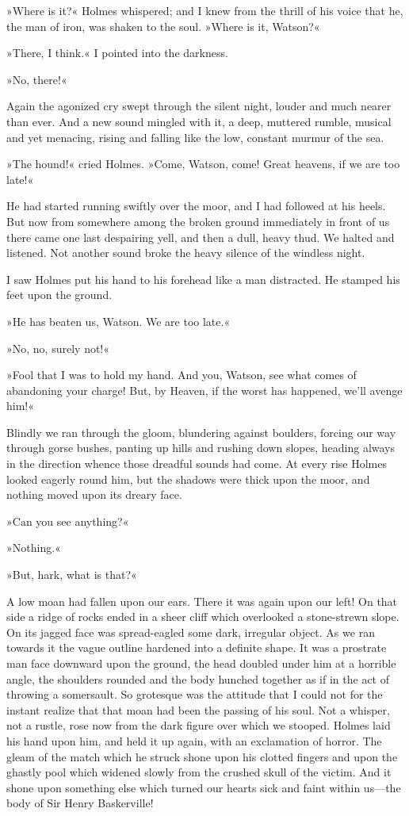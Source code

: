 »Where is it?« Holmes whispered; and I knew from the thrill of his voice that he, the man of iron, was shaken to the soul. »Where is it, Watson?«

»There, I think.« I pointed into the darkness.

»No, there!«

Again the agonized cry swept through the silent night, louder and much nearer than ever. And a new sound mingled with it, a deep, muttered rumble, musical and yet menacing, rising and falling like the low, constant murmur of the sea.

»The hound!« cried Holmes. »Come, Watson, come! Great heavens, if we are too late!«

He had started running swiftly over the moor, and I had followed at his heels. But now from somewhere among the broken ground immediately in front of us there came one last despairing yell, and then a dull, heavy thud. We halted and listened. Not another sound broke the heavy silence of the windless night.

I saw Holmes put his hand to his forehead like a man distracted. He stamped his feet upon the ground.

»He has beaten us, Watson. We are too late.«

»No, no, surely not!«

»Fool that I was to hold my hand. And you, Watson, see what comes of abandoning your charge! But, by Heaven, if the worst has happened, we'll avenge him!«

Blindly we ran through the gloom, blundering against boulders, forcing our way through gorse bushes, panting up hills and rushing down slopes, heading always in the direction whence those dreadful sounds had come. At every rise Holmes looked eagerly round him, but the shadows were thick upon the moor, and nothing moved upon its dreary face.

»Can you see anything?«

»Nothing.«

»But, hark, what is that?«

A low moan had fallen upon our ears. There it was again upon our left! On that side a ridge of rocks ended in a sheer cliff which overlooked a stone-strewn slope. On its jagged face was spread-eagled some dark, irregular object. As we ran towards it the vague outline hardened into a definite shape. It was a prostrate man face downward upon the ground, the head doubled under him at a horrible angle, the shoulders rounded and the body hunched together as if in the act of throwing a somersault. So grotesque was the attitude that I could not for the instant realize that that moan had been the passing of his soul. Not a whisper, not a rustle, rose now from the dark figure over which we stooped. Holmes laid his hand upon him, and held it up again, with an exclamation of horror. The gleam of the match which he struck shone upon his clotted fingers and upon the ghastly pool which widened slowly from the crushed skull of the victim. And it shone upon something else which turned our hearts sick and faint within us—the body of Sir Henry Baskerville!

